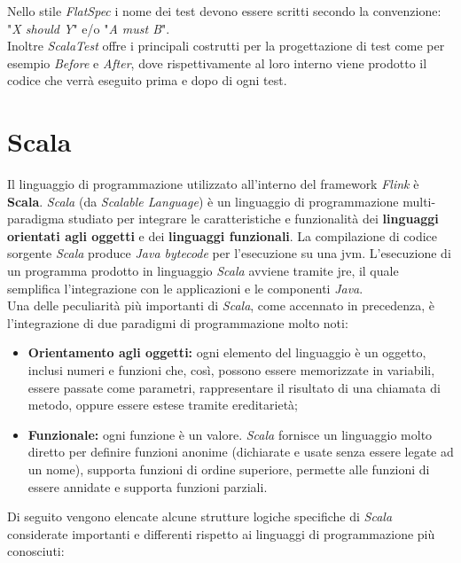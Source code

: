 Nello stile \textit{FlatSpec} i nome dei test devono essere scritti secondo la convenzione: "\textit{X should Y}" e/o "\textit{A must B}".\\
Inoltre \textit{ScalaTest} offre i principali costrutti per la progettazione di test come per esempio \textit{Before} e \textit{After}, dove rispettivamente al loro interno viene  prodotto il codice che verrà eseguito prima e dopo di ogni test.

\section{Scala}\label{sec:scala}
Il linguaggio di programmazione utilizzato all'interno del \gls{framework} \textit{Flink} è \textbf{Scala}. \textit{Scala} (da \textit{Scalable Language}) è un linguaggio di programmazione multi-paradigma studiato per integrare le caratteristiche e funzionalità dei \textbf{linguaggi orientati agli oggetti} e dei \textbf{linguaggi funzionali}. La compilazione di codice sorgente \textit{Scala} produce \textit{Java bytecode} per l'esecuzione su una \gls{jvm}. L'esecuzione di un programma prodotto in linguaggio \textit{Scala} avviene tramite \gls{jre}, il quale semplifica l'integrazione con le applicazioni e le componenti \textit{Java}.\\
Una delle peculiarità più importanti di \textit{Scala}, come accennato in precedenza, è l'integrazione di due paradigmi di programmazione molto noti:
\begin{itemize}
	\item{\textbf{Orientamento agli oggetti:} ogni elemento del linguaggio è un oggetto, inclusi numeri e funzioni che, così, possono essere memorizzate in variabili, essere passate come parametri, rappresentare il risultato di una chiamata di metodo, oppure essere estese tramite ereditarietà;}
	\item{\textbf{Funzionale:} ogni funzione è un valore. \textit{Scala} fornisce un linguaggio molto diretto per definire funzioni anonime (dichiarate e usate senza essere legate ad un nome), supporta funzioni di ordine superiore, permette alle funzioni di essere annidate e supporta funzioni parziali.}
\end{itemize}
Di seguito vengono elencate alcune strutture logiche specifiche di \textit{Scala} considerate importanti e differenti rispetto ai linguaggi di programmazione più conosciuti:
